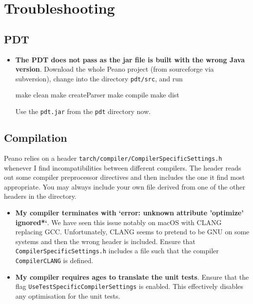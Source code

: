 \chapter{Troubleshooting}

\section{PDT}

\begin{itemize}
  \item \textbf{ The PDT does not pass as the jar file is built with the wrong
  Java version}. Download the whole Peano project (from sourceforge via subversion),
  change into the directory \texttt{pdt/src}, and run
  \begin{code}
  make clean
  make createParser
  make compile
  make dist
  \end{code}
  Use the \texttt{pdt.jar} from the \texttt{pdt} directory now. 
\end{itemize}





\section{Compilation}

Peano relies on a header \texttt{tarch/compiler/CompilerSpecificSettings.h}
whenever I find incompatibilities between different compilers. 
The header reads out some compiler preprocessor directives and then includes the
one it find most appropriate. 
You may always include your own file derived from one of the other headers in
the directory.


\begin{itemize}
  \item \textbf{ My compiler terminates with `error: unknown
   attribute 'optimize' ignored*`}. We have seen this issue notably on macOS
   with CLANG replacing GCC. Unfortunately, CLANG seems to pretend to be GNU on
   some systems and then the wrong header is included. Ensure that
   \texttt{CompilerSpecificSettings.h} includes a file such that the compiler
   \linebreak
   \texttt{CompilerCLANG} is defined.
  \item \textbf{ My compiler requires ages to translate the unit tests}. Ensure
  that the flag \linebreak \texttt{UseTestSpecificCompilerSettings} is enabled.
  This effectively disables any optimisation for the unit tests.
\end{itemize}




